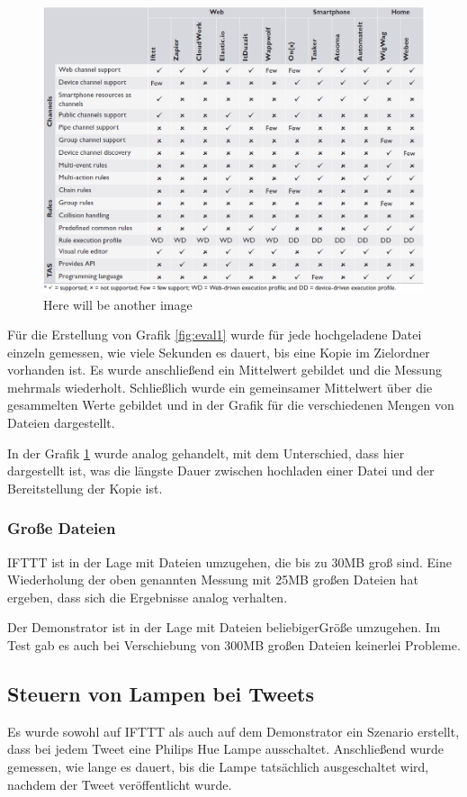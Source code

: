 \begin{figure}
	\centering
	\includegraphics[width=\textwidth]{bilder/TASOverview}
	\caption{Here will be another image}
	\label{fig:eval2}
\end{figure}

Für die Erstellung von Grafik \ref{fig:eval1} wurde für jede hochgeladene Datei einzeln gemessen, wie viele Sekunden es dauert, bis eine Kopie im Zielordner vorhanden ist. Es wurde anschließend ein Mittelwert gebildet und die Messung mehrmals wiederholt. Schließlich wurde ein gemeinsamer Mittelwert über die gesammelten Werte gebildet und in der Grafik für die verschiedenen Mengen von Dateien dargestellt.

In der Grafik \ref{fig:eval2} wurde analog gehandelt, mit dem Unterschied, dass hier dargestellt ist, was die längste Dauer zwischen hochladen einer Datei und der Bereitstellung der Kopie ist.

\subsubsection{Große Dateien}
IFTTT ist in der Lage mit Dateien umzugehen, die bis zu 30MB groß sind. Eine Wiederholung der oben genannten Messung mit 25MB großen Dateien hat ergeben, dass sich die Ergebnisse  analog verhalten. 

Der Demonstrator ist in der Lage mit Dateien \glqq beliebiger\grqq Größe umzugehen. Im Test gab es auch bei Verschiebung von 300MB großen Dateien keinerlei Probleme.

\subsection{Steuern von Lampen bei Tweets}
Es wurde sowohl auf IFTTT als auch auf dem Demonstrator ein Szenario erstellt, dass bei jedem Tweet eine Philips Hue Lampe ausschaltet. Anschließend wurde gemessen, wie lange es dauert, bis die Lampe tatsächlich ausgeschaltet wird, nachdem der Tweet veröffentlicht wurde. 


